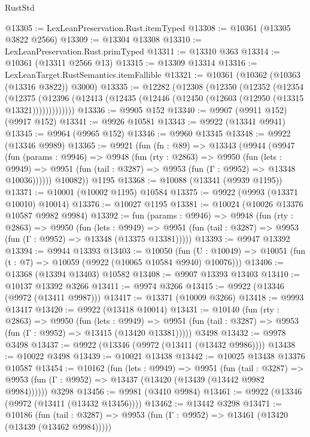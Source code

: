 \begin{lexlean}{RustStd}
\begin{coremodule}
@13305 := LexLeanPreservation.Rust.itemTyped
@13308 := @10361 (@13305 @3822 @2566)
@13309 := @13304 @13308
@13310 := LexLeanPreservation.Rust.primTyped
@13311 := @13310 @363
@13314 := @10361 (@13311 @2566 @13)
@13315 := @13309 @13314
@13316 := LexLeanTarget.RustSemantics.itemFallible
@13321 := @10361 (@10362 (@10363 (@13316 @3822)) @3000)
@13335 := @12282
    (@12308
      (@12350
        (@12352
          (@12354
            (@12375
              (@12396 (@12413 (@12435 (@12446 (@12450 (@12603 (@12950 (@13315 @13321)))))))))))))
@13336 := @9905 @152
@13340 := @9907 (@9911 @152) (@9917 @152)
@13341 := @9926 @10581
@13343 := @9922 (@13341 @9941)
@13345 := @9964 (@9965 @152)
@13346 := @9960 @13345
@13348 := @9922 (@13346 @9989)
@13365 := @9921
    (fun (fn : @89) =>
    @13343
      (@9944
        (@9947
          (fun (params : @9946) =>
          @9948
            (fun (rty : @2863) =>
            @9950
              (fun (lets : @9949) =>
              @9951 (fun (tail : @3287) => @9953 (fun (Γ : @9952) => @13348 @10036))))))
        @10082))
    @1195
@13368 := @10088 (@13341 (@9939 @1195))
@13371 := @10001 (@10002 @1195) @10584
@13375 := @9922 (@9993 (@13371 @10010) @10014)
@13376 := @10027 @1195
@13381 := @10024 (@10026 @13376 @10587 @9982 @9984)
@13392 := fun (params : @9946) =>
  @9948
    (fun (rty : @2863) =>
    @9950
      (fun (lets : @9949) =>
      @9951 (fun (tail : @3287) => @9953 (fun (Γ : @9952) => @13348 (@13375 @13381)))))
@13393 := @9947 @13392
@13394 := @9944 @13393
@13403 := @10050
    (fun (U : @10049) => @10051 (fun (t : @7) => @10059 (@9922 (@10065 @10584 @9940) @10076)))
@13406 := @13368 (@13394 @13403) @10582
@13408 := @9907 @13393 @13403
@13410 := @10137 @13392 @3266
@13411 := @9974 @3266
@13415 := @9922 (@13346 (@9972 (@13411 @9987)))
@13417 := @13371 (@10009 @3266)
@13418 := @9993 @13417
@13420 := @9922 (@13418 @10014)
@13431 := @10140
    (fun (rty : @2863) =>
    @9950
      (fun (lets : @9949) =>
      @9951 (fun (tail : @3287) => @9953 (fun (Γ : @9952) => @13415 (@13420 @13381)))))
    @3498
@13432 := @9978 @3498
@13437 := @9922 (@13346 (@9972 (@13411 (@13432 @9986))))
@13438 := @10022 @3498
@13439 := @10021 @13438
@13442 := @10025 @13438 @13376 @10587
@13454 := @10162
    (fun (lets : @9949) =>
    @9951
      (fun (tail : @3287) =>
      @9953 (fun (Γ : @9952) => @13437 (@13420 (@13439 (@13442 @9982 @9984))))))
    @3298
@13456 := @9981 (@3410 @9984)
@13461 := @9922 (@13346 (@9972 (@13411 (@13432 @13456))))
@13462 := @13442 @3298
@13471 := @10186
    (fun (tail : @3287) => @9953 (fun (Γ : @9952) => @13461 (@13420 (@13439 (@13462 @9984)))))

\end{coremodule}
\end{lexlean}
